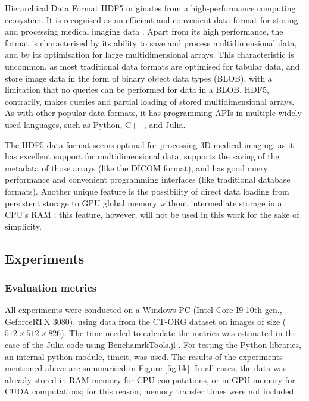 \documentclass{juliacon}
\begin{document}
Hierarchical Data Format HDF5 \cite{hdf5} originates from a high-performance computing ecosystem. It is recognised as an efficient and convenient data format for storing and processing medical imaging data \cite{hdf5Medical}. Apart from its high performance, the format is characterised by its ability to save and process multidimensional data, and by its optimisation for large multidimensional arrays. This characteristic is uncommon, as most traditional data formats are optimised for tabular data, and store image data in the form of binary object data types (BLOB), with a limitation that no queries can be performed for data in a BLOB. HDF5, contrarily, makes queries and partial loading of stored multidimensional arrays. As with other popular data formats, it has programming APIs in multiple widely-used languages, such as Python, C++, and Julia.

The HDF5 data format seems optimal for processing 3D medical imaging, as it has excellent support for multidimensional data, supports the saving of the metadata of those arrays (like the DICOM format), and has good query performance and convenient programming interfaces (like traditional database formats). Another unique feature is the possibility of direct data loading from persistent storage to GPU global memory without intermediate storage in a CPU's RAM  \cite{hdf5GPU}; this feature, however, will not be used in this work for the sake of simplicity.

\subsection{Experiments}
\subsubsection{Evaluation metrics}
All experiments were conducted on a Windows PC (Intel Core I9 10th gen., GeforceRTX 3080), using data from the CT-ORG \cite{CTORG} dataset on images of size ($512 \times 512 \times 826$). The time needed to calculate the metrics was estimated in the case of the Julia code using BenchamrkTools.jl \cite{BenchmarkTools}. For testing the Python libraries, an internal python module, timeit, was used. The results of the experiments mentioned above are summarised in Figure \ref{fig:bk}. In all cases, the data was already stored in RAM memory for CPU computations, or in GPU memory for CUDA computations; for this reason, memory transfer times were not included.
\end{document}
